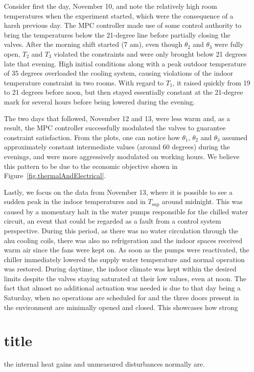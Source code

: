 Consider first the day, November 10, and note the relatively high room temperatures when the experiment started, which were the consequence of a harsh previous day. The MPC controller made use of some control authority to bring the temperatures below the 21-degree line before partially closing the valves. After the morning shift started (7 am), even though $\theta_2$ and $\theta_3$ were fully open, $T_2$ and $T_3$ violated the constraints and were only brought below 21 degrees late that evening. High initial conditions along with a peak outdoor temperature of 35 degrees overloaded the cooling system, causing violations of the indoor temperature constraint in two rooms. With regard to $T_1$, it raised quickly from 19 to 21 degrees before noon, but then stayed essentially constant at the 21-degree mark for several hours before being lowered during the evening.

The two days that followed, November 12 and 13, were less warm and, as a result, the MPC controller successfully modulated the valves to guarantee constraint satisfaction. From the plots, one can notice how $\theta_1$, $\theta_2$ and $\theta_3$ assumed  approximately constant intermediate values (around 60 degrees) during the evenings, and were more aggressively modulated on working hours. We believe this pattern to be due to the economic objective shown in Figure~\ref{fig.thermalAndElectrical}.

Lastly, we focus on the data from November 13, where it is possible to see a sudden peak in the indoor temperatures and in $T_{\text{sup}}$ around midnight. This was caused by a momentary halt in the water pumps responsible for the chilled water circuit, an event that could be regarded as a fault from a control system perspective. During this period, as there was no water circulation through the \ac{ahu} cooling coils, there was also no refrigeration and the indoor spaces received warm air since the fans were kept on. As soon as the pumps were reactivated, the chiller immediately lowered the supply water temperature and normal operation was restored. During daytime, the indoor climate was kept within the desired limits despite the valves staying saturated at their low values, even at noon. The fact that almost no additional actuation was needed is due to that day being a Saturday, when no operations are scheduled for and the three doors present in the environment are minimally opened and closed. This showcases how strong\part{title} the internal heat gains and unmeasured disturbances normally are.

